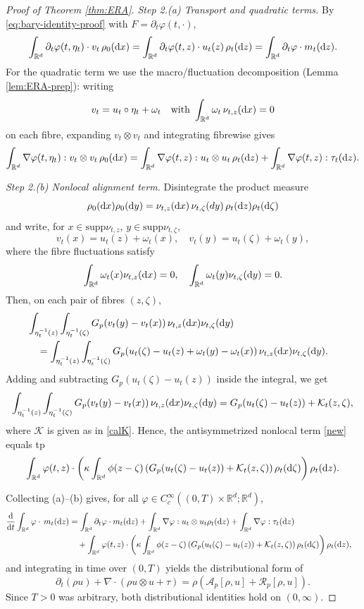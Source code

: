 \documentclass[10pt,reqno]{amsart}
\numberwithin{equation}{section}
\newcommand{\R}{\mathbb R}
\newcommand{\lt}{\left}
\newcommand{\rt}{\right}
\newcommand{\pa}{\partial}
\newcommand{\intr}{\int_{\R^d}}
\newcommand{\calA}{\mathcal A}
\newcommand{\calK}{\mathcal K}
\newcommand{\calR}{\mathcal R}
\newcommand{\rd}{\textnormal{d}}
\newcommand{\dx}{\textnormal{d}x}
\newcommand{\dt}{\textnormal{d}t}
\newcommand{\dy}{\textnormal{d}y}
\newcommand{\dz}{\textnormal{d}z}
\newcommand{\supp}{\text{supp}}
\begin{document}
\begin{proof}[Proof of Theorem \ref{thm:ERA}]
\smallskip
\noindent  \emph{Step 2.(a) Transport and quadratic terms.}
By \eqref{eq:bary-identity-proof} with $F=\pa_t\varphi(t,\cdot)$, 
\[
\intr \pa_t\varphi(t,\eta_t)\cdot v_t\,\rho_0(\dx)
=\intr \pa_t\varphi(t,z)\cdot u_t(z)\,\rho_t(\dz)=\intr \pa_t\varphi\cdot m_t(\dz).
\]
For the quadratic term we use the macro/fluctuation decomposition (Lemma \ref{lem:ERA-prep}): writing
\[
v_t=u_t\circ\eta_t+\omega_t \quad \text{with }\intr \omega_t\,\nu_{t,z}(\dx)=0
\]
on each fibre, expanding $v_t\otimes v_t$ and integrating fibrewise gives
\[
\intr \nabla\varphi(t,\eta_t): v_t\otimes v_t\,\rho_0(\dx) =\intr \nabla\varphi(t,z): u_t\otimes u_t \, \rho_t(\dz) + \intr \nabla\varphi(t,z): \tau_t (\dz).
\]

\smallskip
\noindent \emph{Step 2.(b) Nonlocal alignment term.}
Disintegrate the product measure 
\[
\rho_0(\dx)\rho_0(\dy)=\nu_{t,z}(\dx)\,\nu_{t,\zeta}(dy)\,\rho_t(\dz)\rho_t(\rd\zeta)
\] 
and write, for $x \in \supp \nu_{t,z}$, $y \in \supp \nu_{t,\zeta}$,
\[
v_t(x) = u_t(z) + \omega_t(x), \quad v_t(y) = u_t(\zeta) + \omega_t(y),
\]
where the fibre fluctuations satisfy
\[
\intr \omega_t(x) \nu_{t,z}(\dx) = 0, \quad \intr \omega_t(y) \nu_{t,\zeta}(\dy) = 0.
\]
Then, on each pair of fibres $(z,\zeta)$,
\begin{align*}
&\int_{\eta_t^{-1}(z)} \int_{\eta_t^{-1}(\zeta)} G_p (v_t(y)-v_t(x))\,\nu_{t,z}(\dx) \nu_{t,\zeta}(\dy) \cr
&\quad= \int_{\eta_t^{-1}(z)} \int_{\eta_t^{-1}(\zeta)}
G_p (u_t(\zeta)-u_t(z) + \omega_t(y)-\omega_t(x))\,\nu_{t,z}(\dx) \nu_{t,\zeta}(\dy).
\end{align*}
Adding and subtracting $G_p(u_t(\zeta)-u_t(z))$ inside the integral, we get
\[
\int_{\eta_t^{-1}(z)} \int_{\eta_t^{-1}(\zeta)} G_p (v_t(y)-v_t(x))\,\nu_{t,z}(\dx) \nu_{t,\zeta}(\dy) = G_p(u_t(\zeta)-u_t(z)) + \calK_t(z,\zeta),
\]
where $\calK$ is given as in \eqref{calK}. Hence, the antisymmetrized nonlocal term \eqref{new} equals tp
\[
\intr \varphi(t,z)\cdot \lt(\kappa\intr \phi(z-\zeta)
\lt( G_p (u_t(\zeta)-u_t(z)) + \calK_t(z,\zeta)\rt)\rho_t(\rd\zeta)\rt)\rho_t(\dz).
\]
 
Collecting (a)--(b) gives, for all $\varphi\in C_c^\infty((0,T)\times\R^d;\R^d)$,
\begin{align*}
\frac{\rd}{\dt}\intr \varphi \cdot \,m_t(\dz) &=\intr \pa_t\varphi\cdot m_t(\dz) +\intr \nabla\varphi: u_t\otimes u_t \rho_t(\dz) +\intr \nabla\varphi:  \tau_t(\dz) \cr
&\quad +\intr \varphi(t,z)\cdot \lt(\kappa\intr \phi(z-\zeta)
\lt( G_p (u_t(\zeta)-u_t(z)) + \calK_t(z,\zeta)\rt)\rho_t(\rd\zeta)\rt)\rho_t(\dz),
\end{align*}
and integrating in time over $(0,T)$ yields the distributional form of
\[
\pa_t(\rho u)+\nabla \cdot(\rho u\otimes u+\tau) =\rho (\calA_p[\rho,u]+\calR_p[\rho,u]).
\]
Since $T>0$ was arbitrary, both distributional identities hold on $(0,\infty)$.


\end{proof}
\end{document}
